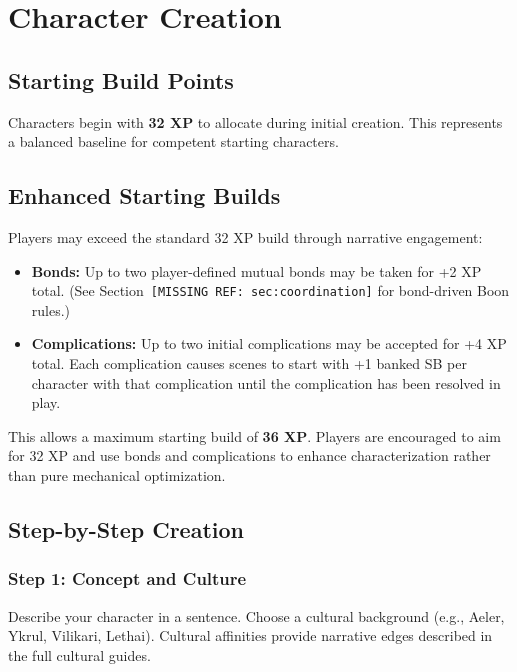 
\section{Character Creation}

\subsection{Starting Build Points}

Characters begin with \textbf{32 XP} to allocate during initial creation. This represents a balanced baseline for competent starting characters.

\subsection{Enhanced Starting Builds}

Players may exceed the standard 32 XP build through narrative engagement:

\begin{itemize}
  \item \textbf{Bonds:} Up to two player-defined mutual bonds may be taken for +2 XP total. (See Section~\texttt{[MISSING REF: sec:coordination]} for bond-driven Boon rules.)
  \item \textbf{Complications:} Up to two initial complications may be accepted for +4 XP total. Each complication causes scenes to start with +1 banked SB per character with that complication until the complication has been resolved in play.
\end{itemize}

This allows a maximum starting build of \textbf{36 XP}. Players are encouraged to aim for 32 XP and use bonds and complications to enhance characterization rather than pure mechanical optimization.

\subsection{Step-by-Step Creation}

\subsubsection{Step 1: Concept and Culture}
Describe your character in a sentence. Choose a cultural background (e.g., Aeler, Ykrul, Vilikari, Lethai). Cultural affinities provide narrative edges described in the full cultural guides.

